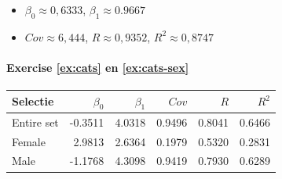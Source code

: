 \begin{itemize}
  \item $\beta_{0} \approx 0,6333$, $\beta_{1} \approx 0.9667$
  \item $Cov \approx 6,444$, $R \approx 0,9352$, $R^2 \approx 0,8747$
\end{itemize}

\paragraph{Exercise \ref{ex:cats} en \ref{ex:cats-sex}}

\begin{center}
  \begin{tabular}{lrrrrr}
  	\toprule
    \textbf{Selectie} & \textbf{$\beta_{0}$} & \textbf{$\beta_{1}$} & \textbf{$Cov$} & \textbf{$R$} & \textbf{$R^2$} \\
    \midrule
  	Entire set & -0.3511 & 4.0318 & 0.9496 & 0.8041 & 0.6466 \\
  	Female       &  2.9813 & 2.6364 & 0.1979 & 0.5320 & 0.2831 \\
  	Male         & -1.1768 & 4.3098 & 0.9419 & 0.7930 & 0.6289 \\
    \bottomrule
  \end{tabular}
\end{center}
